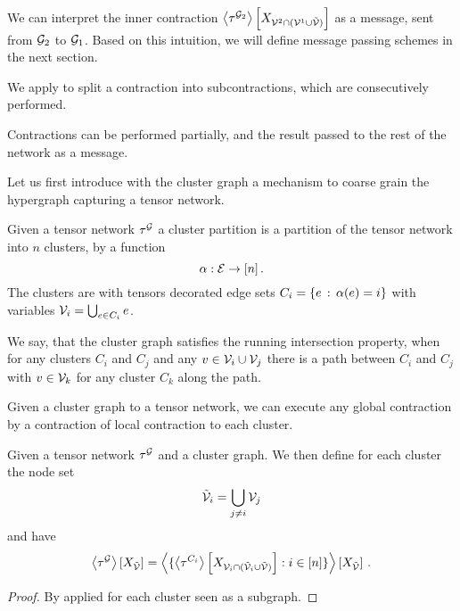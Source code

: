We can interpret the inner contraction $\left\langle \tau^{\mathcal{G}_2}\right\rangle \left[ X_{\mathcal{V}^{2}\cap(\mathcal{V}^{1}\cup\tilde{\mathcal{V}})} \right]$ as a message, sent from $\mathcal{G}_2$ to $\mathcal{G}_1$.
Based on this intuition, we will define message passing schemes in the next section.




We apply  to split a contraction into subcontractions, which are consecutively performed.

Contractions can be performed partially, and the result passed to the rest of the network as a message.


Let us first introduce with the cluster graph a mechanism to coarse grain the hypergraph capturing a tensor network.

\begin{definition}
	Given a tensor network $\tau^{\mathcal{G}}$ a cluster partition is a partition of the tensor network into $n$ clusters, by a function
		\[ \alpha : \mathcal{E} \rightarrow [n] \, . \]
	The clusters are with tensors decorated edge sets $C_{i} = \{e \, : \, \alpha(e) = i\}$ with variables $\mathcal{V}_i = \bigcup_{e \in C_{i}} e$.

	We say, that the cluster graph satisfies the running intersection property, when for any clusters $C_i$ and $C_j$ and any $v\in\mathcal{V}_i\cup\mathcal{V}_j$ there is a path between $C_i$ and $C_j$ with $v\in\mathcal{V}_k$ for any cluster $C_k$ along the path.
\end{definition}

Given a cluster graph to a tensor network, we can execute any global contraction by a contraction of local contraction to each cluster.

\begin{theorem}\label{the:contractionClusterSplit}
	Given a tensor network $\tau^{\mathcal{G}}$ and a cluster graph.
	We then define for each cluster the node set
	\begin{align*}
		\tilde{\mathcal{V}}_i = \bigcup_{j\neq i} \mathcal{V}_j
	\end{align*}
	and have
		\[ \left\langle \tau^{\mathcal{G}}\right\rangle \left[ X_{\tilde{\mathcal{V}}} \right] = 
		\left\langle 
			\{ \left\langle \tau^{C_{i}}\right\rangle \left[ X_{\mathcal{V}_i \cap (\tilde{\mathcal{V}}_i\cup\tilde{\mathcal{V}})} \right]  : i \in [n]\}
		\right\rangle \left[ X_{\tilde{\mathcal{V}}} \right]  \, . \]
\end{theorem}
\begin{proof}
	By  applied for each cluster seen as a subgraph.
\end{proof}



